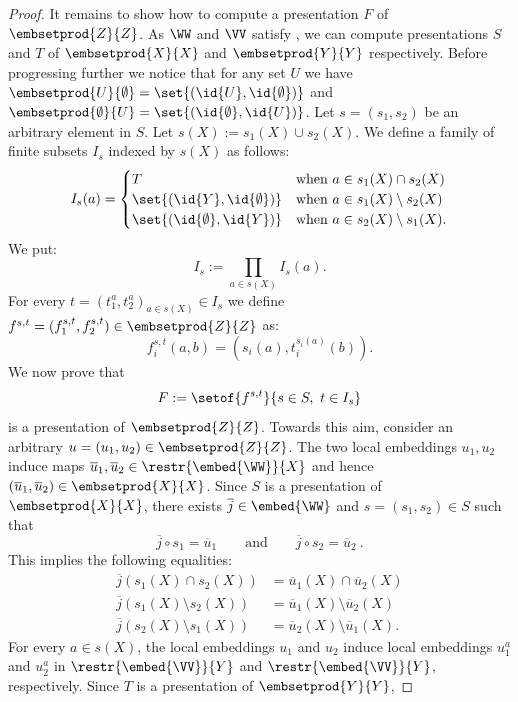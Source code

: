 \begin{proof}
It remains to show how to compute a presentation $F$ of $\embsetprod{Z}{Z}$.
As $\WW$ and $\VV$ satisfy , we
can compute presentations $S$ and $T$ of $\embsetprod{X}{X}$ and $\embsetprod{Y}{Y}$ respectively.
Before progressing further we notice that for any set $U$ we have
$\embsetprod{U}{\emptyset} = \set{(\id{U},\id{\emptyset})}$ and
$\embsetprod{\emptyset}{U} = \set{(\id{\emptyset},\id{U})}$.
Let $s = (s_1,s_2)$ be an arbitrary element in $S$.
Let $s(X) := s_1(X)\cup s_2(X)$.
We define a family of finite subsets $I_s$ indexed by $s(X)$ as follows:
\[
I_s(a) =
\begin{cases}
T & \text{when } a\in s_1(X)\cap s_2(X) \\
\set{(\id{Y},\id{\emptyset})} & \text{when } a\in s_1(X)\setminus s_2(X) \\
\set{(\id{\emptyset},\id{Y})} & \text{when } a\in s_2(X)\setminus s_1(X).
\end{cases}
\]
We put:
\[
I_s:= \prod_{a\in s(X)} I_s(a).
\]
For every $t = (t^a_1,t^a_2)_{a\in s(X)} \in I_s$ we define
$f^{s,t} = (f^{s,t}_1,f^{s,t}_2) \in \embsetprod{Z}{Z}$ as:
\[
f^{s,t}_i(a,b) = (s_i(a),t^{s_i(a)}_i(b)).
\]
We now prove that
\[
F := \setof{f^{s,t}}{s\in S,\ t\in I_s}
\]
is a presentation of $\embsetprod{Z}{Z}$.
%
Towards this aim,
consider an arbitrary $u = (u_1,u_2) \in \embsetprod{Z}{Z}$.
The two local embeddings
$u_1,u_2$ induce maps $\overline{u}_1,\overline{u}_2\in\restr{\embed{\WW}}{X}$ and hence
$(\overline{u}_1,\overline{u}_2)\in\embsetprod{X}{X}$.
Since $S$ is a presentation of $\embsetprod{X}{X}$,
there exists $\overline{j}\in\embed{\WW}$ and $s = (s_1,s_2)\in S$ such that
\[
\overline{j} \circ s_1 = \overline{u}_1
\qquad \text{and} \qquad
\overline{j} \circ s_2 = \overline{u}_2 \ .
\]
This implies the following equalities:
\begin{align*}
\overline{j}(s_1(X)\cap s_2(X)) & =  \overline{u}_1(X)\cap\overline{u}_2(X) \\
\overline{j}(s_1(X)\setminus s_2(X)) & =  \overline{u}_1(X)\setminus\overline{u}_2(X) \\
\overline{j}(s_2(X)\setminus s_1(X)) & =  \overline{u}_2(X)\setminus\overline{u}_1(X).
\end{align*}
For every  $a \in s(X)$, the local embeddings
$u_1$ and $u_2$ induce local embeddings $u^a_1$ and $u^a_2$ in
$\restr{\embed{\VV}}{Y}$ and $\restr{\embed{\VV}}{Y}$,
respectively.
Since $T$ is a presentation of $\embsetprod{Y}{Y}$,

\end{proof}
